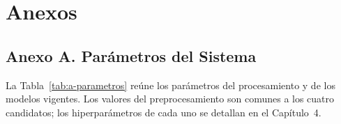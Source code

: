 \clearpage
\chapter*{Anexos}

\section{Anexo A. Parámetros del Sistema}
La Tabla~\ref{tab:a-parametros} reúne los parámetros del procesamiento y de los modelos vigentes. Los valores del preprocesamiento son comunes a los cuatro candidatos; los hiperparámetros de cada uno se detallan en el Capítulo~4.

